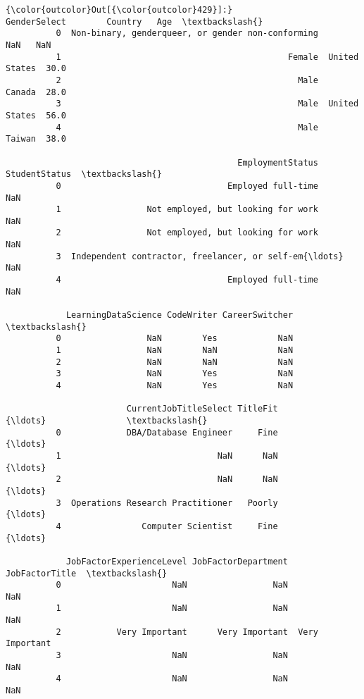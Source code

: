 \documentclass[11pt]{article}
\begin{document}
\begin{Verbatim}[commandchars=\\\{\}]
{\color{outcolor}Out[{\color{outcolor}429}]:}                                         GenderSelect        Country   Age  \textbackslash{}
          0  Non-binary, genderqueer, or gender non-conforming            NaN   NaN   
          1                                             Female  United States  30.0   
          2                                               Male         Canada  28.0   
          3                                               Male  United States  56.0   
          4                                               Male         Taiwan  38.0   
          
                                              EmploymentStatus StudentStatus  \textbackslash{}
          0                                 Employed full-time           NaN   
          1                 Not employed, but looking for work           NaN   
          2                 Not employed, but looking for work           NaN   
          3  Independent contractor, freelancer, or self-em{\ldots}           NaN   
          4                                 Employed full-time           NaN   
          
            LearningDataScience CodeWriter CareerSwitcher  \textbackslash{}
          0                 NaN        Yes            NaN   
          1                 NaN        NaN            NaN   
          2                 NaN        NaN            NaN   
          3                 NaN        Yes            NaN   
          4                 NaN        Yes            NaN   
          
                        CurrentJobTitleSelect TitleFit              {\ldots}                \textbackslash{}
          0             DBA/Database Engineer     Fine              {\ldots}                 
          1                               NaN      NaN              {\ldots}                 
          2                               NaN      NaN              {\ldots}                 
          3  Operations Research Practitioner   Poorly              {\ldots}                 
          4                Computer Scientist     Fine              {\ldots}                 
          
            JobFactorExperienceLevel JobFactorDepartment  JobFactorTitle  \textbackslash{}
          0                      NaN                 NaN             NaN   
          1                      NaN                 NaN             NaN   
          2           Very Important      Very Important  Very Important   
          3                      NaN                 NaN             NaN   
          4                      NaN                 NaN             NaN   
          

\end{Verbatim}
\end{document}
